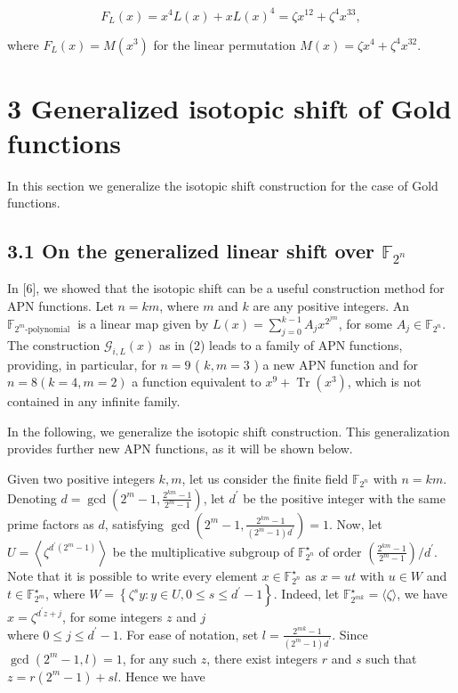 \documentclass[10pt]{article}
\begin{document}
$$
F_{L}(x)=x^{4} L(x)+x L(x)^{4}=\zeta x^{12}+\zeta^{4} x^{33},
$$

where $F_{L}(x)=M\left(x^{3}\right)$ for the linear permutation $M(x)=\zeta x^{4}+\zeta^{4} x^{32}$.

\section*{3 Generalized isotopic shift of Gold functions}
In this section we generalize the isotopic shift construction for the case of Gold functions.

\subsection*{3.1 On the generalized linear shift over $\mathbb{F}_{2^{n}}$}
In [6], we showed that the isotopic shift can be a useful construction method for APN functions. Let $n=k m$, where $m$ and $k$ are any positive integers. An $\mathbb{F}_{2^{m} \text {-polynomial }}$ is a linear map given by $L(x)=\sum_{j=0}^{k-1} A_{j} x^{2^{j m}}$, for some $A_{j} \in \mathbb{F}_{2^{n}}$. The construction $\mathscr{G}_{i, L}(x)$ as in (2) leads to a family of APN functions, providing, in particular, for $n=9$ ( $k, m=3$ ) a new APN function and for $n=8(k=4, m=2)$ a function equivalent to $x^{9}+\operatorname{Tr}\left(x^{3}\right)$, which is not contained in any infinite family.

In the following, we generalize the isotopic shift construction. This generalization provides further new APN functions, as it will be shown below.

Given two positive integers $k, m$, let us consider the finite field $\mathbb{F}_{2^{n}}$ with $n=k m$. Denoting $d=\operatorname{gcd}\left(2^{m}-1, \frac{2^{k m}-1}{2^{m}-1}\right)$, let $d^{\prime}$ be the positive integer with the same prime factors as $d$, satisfying $\operatorname{gcd}\left(2^{m}-1, \frac{2^{k m}-1}{\left(2^{m}-1\right) d^{\prime}}\right)=1$. Now, let $U=\left\langle\zeta^{d^{\prime}\left(2^{m}-1\right)}\right\rangle$ be the multiplicative subgroup of $\mathbb{F}_{2^{n}}^{\star}$ of order $\left(\frac{2^{k m}-1}{2^{m}-1}\right) / d^{\prime}$. Note that it is possible to write every element $x \in \mathbb{F}_{2^{n}}^{\star}$ as $x=u t$ with $u \in W$ and $t \in \mathbb{F}_{2^{m}}^{\star}$, where $W=\left\{\zeta^{s} y: y \in U, 0 \leq\right. \left.s \leq d^{\prime}-1\right\}$. Indeed, let $\mathbb{F}_{2^{m k}}^{\star}=\langle\zeta\rangle$, we have $x=\zeta^{d^{\prime} z+j}$, for some integers $z$ and $j$\\
where $0 \leq j \leq d^{\prime}-1$. For ease of notation, set $l=\frac{2^{m k}-1}{\left(2^{m}-1\right) d^{\prime}}$. Since $\operatorname{gcd}\left(2^{m}-1, l\right)=1$, for any such $z$, there exist integers $r$ and $s$ such that $z=r\left(2^{m}-1\right)+s l$. Hence we have
\end{document}
